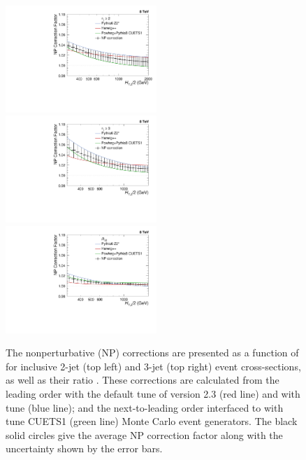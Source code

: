 \begin{figure}[!ht]
 \begin{center}
 \hspace*{-5mm}\includegraphics[width=0.51\textwidth]{Plots_HT_2_150/Final_NP_Corr_2.pdf}%
 ~~\includegraphics[width=0.51\textwidth]{Plots_HT_2_150/Final_NP_Corr_3.pdf}\\
 \includegraphics[width=0.51\textwidth]{Plots_HT_2_150/Final_NP_Corr_Ratio_32.pdf}
 \caption[]{The nonperturbative (NP) corrections are presented as a function of \httwo for inclusive 2-jet (top left) and 3-jet (top right) event cross-sections, as well as their ratio \ratio. These corrections are calculated from the leading order \HERWIGPP with the default tune of version 2.3 (red line) and \PYTHIAS with tune \Ztwostar (blue line); and the next-to-leading order \POWHEG interfaced to \PYTHIAE with tune CUETS1 (green line) Monte Carlo event generators. The black solid circles give the average NP correction factor along with the uncertainty shown by the error bars. }
 \label{fig:np_factors}
 \end{center}
\end{figure}


